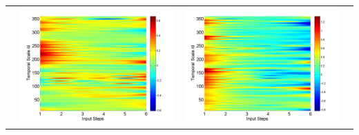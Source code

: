 \documentclass[draft,wrr]{AGUTeX}
\begin{document}
\begin{article}
\begin{table}[H]
\begin{tabular}{cccc}
&\begin{minipage}{.3\textwidth}\includegraphics[width=\linewidth]{resultgraph/05585000pdiff_former.png}\end{minipage}
&\begin{minipage}{.3\textwidth}\includegraphics[width=\linewidth]{resultgraph/05585000epdiff_former.png}\end{minipage}

\end{tabular}
\end{table}
\end{article}
\end{document}
